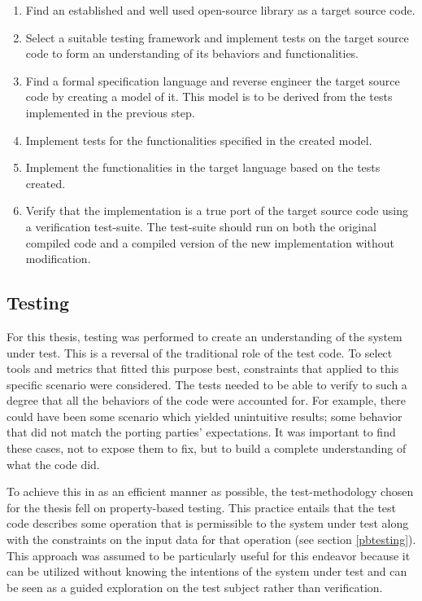 \begin{enumerate}
  \item Find an established and well used open-source library as a target source code.
  \item Select a suitable testing framework and implement tests on the target source code to form an understanding of its behaviors and functionalities.
  \item Find a formal specification language and reverse engineer the target source code by creating a model of it. This model is to be derived from the tests implemented in the previous step.
  \item Implement tests for the functionalities specified in the created model.
  \item Implement the functionalities in the target language based on the tests created.
  \item Verify that the implementation is a true port of the target source code using a verification test-suite. The test-suite should run on both the original compiled code and a compiled version of the new implementation without modification.
\end{enumerate}



\subsection{Testing}\label{tests}

For this thesis, testing was performed to create an understanding of the system under test. This is a reversal of the traditional role of the test code. To select tools and metrics that fitted this purpose best, constraints that applied to this specific scenario were considered. The tests needed to be able to verify to such a degree that all the behaviors of the code were accounted for. For example, there could have been some scenario which yielded unintuitive results; some behavior that did not match the porting parties' expectations. It was important to find these cases, not to expose them to fix, but to build a complete understanding of what the code did. 

To achieve this in as an efficient manner as possible, the test-methodology chosen for the thesis fell on property-based testing. This practice entails that the test code describes some operation that is permissible to the system under test along with the constraints on the input data for that operation (see section \ref{pbtesting}). This approach was assumed to be particularly useful for this endeavor because it can be utilized without knowing the intentions of the system under test and can be seen as a guided exploration on the test subject rather than verification.

